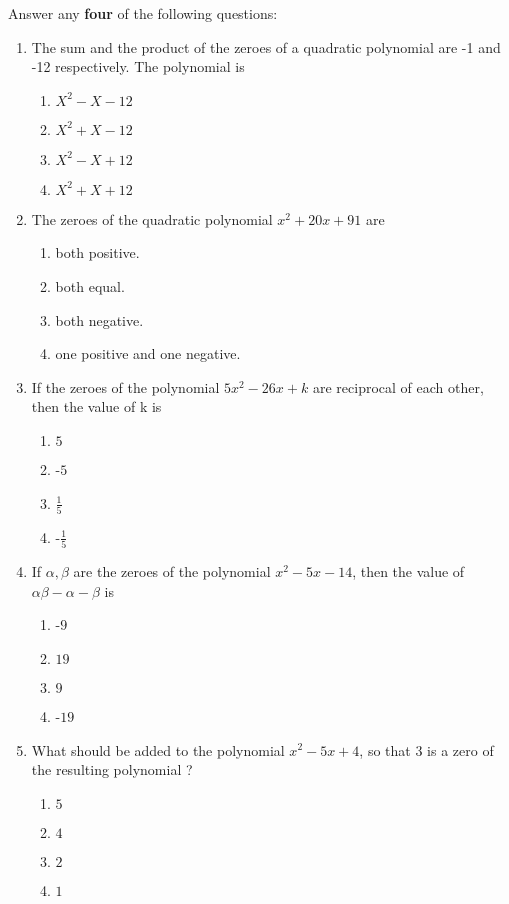 \item Answer any \textbf{four} of the following questions:
\begin{enumerate}  
\item The sum and the product of the zeroes of a quadratic polynomial are -1 and -12 respectively. The polynomial is 
\begin{enumerate}  
\item $X^2-X-12$
\item $X^2+X-12$
\item $X^2-X+12$
\item $X^2+X+12$
\end{enumerate}  
\item The zeroes of the quadratic polynomial $x^2+20x+91$ are
\begin{enumerate}  
\item both positive.
\item both equal.
\item both negative.
\item one positive and one negative.  
\end{enumerate}  
\item  If the zeroes of the polynomial $5x^2-26x+k$ are reciprocal of each other, then the value of k is 
\begin{enumerate}  
\item  $5$
\item -$5$
\item  $\frac{1}{5}$
\item -$\frac{1}{5}$
\end{enumerate}  
\item   If $\alpha,\beta$ are the zeroes of the polynomial $x^2-5x-14$, then the value of $\alpha\beta-\alpha-\beta$ is
\begin{enumerate}  
\item -$9$
\item  $19$
\item  $9$
\item -$19$
\end{enumerate}  
\item What should be added to the polynomial $x^2-5x+4$, so that $3$ is a zero of the resulting polynomial ? 
\begin{enumerate}  
\item $5$
\item $4$
\item $2$
\item $1$
\end{enumerate} 
\end{enumerate}

